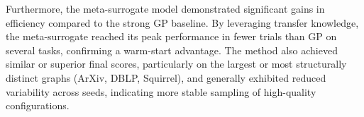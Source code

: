 {%
	Furthermore, the meta-surrogate model demonstrated significant gains in efficiency compared to the strong GP baseline. By leveraging transfer knowledge, the meta-surrogate reached its peak performance in fewer trials than GP on several tasks, confirming a warm-start advantage. The method also achieved similar or superior final scores, particularly on the largest or most structurally distinct graphs (ArXiv, DBLP, Squirrel), and generally exhibited reduced variability across seeds, indicating more stable sampling of high-quality configurations.
}

\onecolumn \maketitle \normalsize \setcounter{footnote}{0} \vfill
